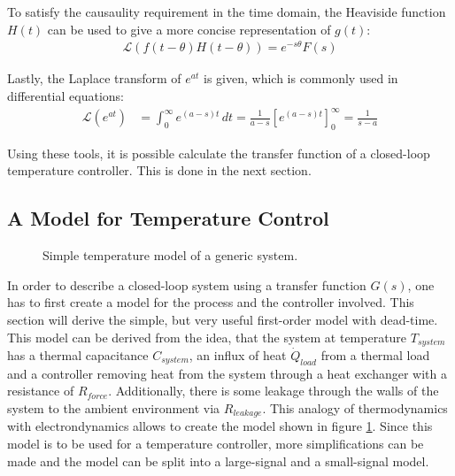 To satisfy the causaulity requirement in the time domain, the Heaviside function $H(t)$ can be used to give a more concise representation of $g(t)$:
\begin{align}
    \mathscr{L}\left( f(t-\theta) H(t-\theta) \right) = e^{-s\theta} F(s) \label{eqn:laplace_causality}
\end{align}

Lastly, the Laplace transform of $e^{at}$ is given, which is commonly used in differential equations:
\begin{align}
    \mathscr{L}\left(e^{at} \right) &= \int_0^\infty e^{(a-s)t}\,dt = \frac{1}{a-s} \left[e^{(a-s)t} \right]_0^\infty = \frac{1}{s-a} \label{eqn:laplace_exponential}
\end{align}


Using these tools, it is possible calculate the transfer function of a closed-loop temperature controller. This is done in the next section.

\clearpage
\subsection{A Model for Temperature Control}

\begin{figure}[ht]
    \centering
    \caption{Simple temperature model of a generic system.}
    \label{fig:first_order_model_room}
\end{figure}

In order to describe a closed-loop system using a transfer function $G(s)$, one has to first create a model for the process and the controller involved. This section will derive the simple, but very useful first-order model with dead-time. This model can be derived from the idea, that the system at temperature $T_{system}$ has a thermal capacitance $C_{system}$, an influx of heat $\dot Q_{load}$ from a thermal load and a controller removing heat from the system through a heat exchanger with a resistance of $R_{force}$. Additionally, there is some leakage through the walls of the system to the ambient environment via $R_{leakage}$. This analogy of thermodynamics with electrondynamics allows to create the model shown in figure \ref{fig:first_order_model_room}. Since this model is to be used for a temperature controller, more simplifications can be made and the model can be split into a large-signal and a small-signal model.

